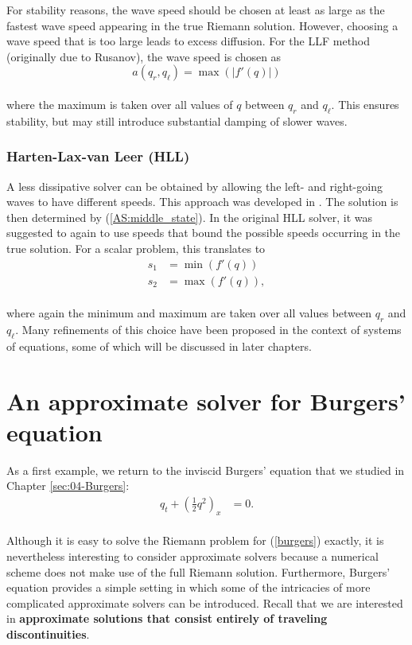 \documentclass{SIAMbook2016}
\begin{document}
For stability reasons, the wave speed should be chosen at least as large
as the fastest wave speed appearing in the true Riemann solution.
However, choosing a wave speed that is too large leads to excess
diffusion. For the LLF method (originally due to Rusanov), the wave
speed is chosen as \[a(q_r, q_\ell) = \max(|f'(q)|)\]\\
where the maximum is taken over all values of \(q\) between \(q_r\) and
\(q_\ell\). This ensures stability, but may still introduce substantial
damping of slower waves.

\hypertarget{harten-lax-van-leer-hll}{%
\subsection{Harten-Lax-van Leer (HLL)}\label{harten-lax-van-leer-hll}}

A less dissipative solver can be obtained by allowing the left- and
right-going waves to have different speeds. This approach was developed
in \cite{HLL}. The solution is then determined by
(\ref{AS:middle_state}). In the original HLL solver, it was suggested to
again to use speeds that bound the possible speeds occurring in the true
solution. For a scalar problem, this translates to\\
\begin{align*}
s_1 & = \min(f'(q)) \\
s_2 & = \max(f'(q)),
\end{align*}\\
where again the minimum and maximum are taken over all values between
\(q_r\) and \(q_\ell\). Many refinements of this choice have been
proposed in the context of systems of equations, some of which will be
discussed in later chapters.

\hypertarget{an-approximate-solver-for-burgers-equation}{%
\chapter{An approximate solver for Burgers'
equation}\label{an-approximate-solver-for-burgers-equation}}
\label{sec:11-Burgers_approximate}
As a first example, we return to the inviscid Burgers' equation that we
studied in Chapter \ref{sec:04-Burgers}:\\
\begin{align} \label{burgers}
q_t + \left(\frac{1}{2}q^2\right)_x & = 0.
\end{align}\\
Although it is easy to solve the Riemann problem for (\ref{burgers})
exactly, it is nevertheless interesting to consider approximate solvers
because a numerical scheme does not make use of the full Riemann
solution. Furthermore, Burgers' equation provides a simple setting in
which some of the intricacies of more complicated approximate solvers
can be introduced. Recall that we are interested in \textbf{approximate
solutions that consist entirely of traveling discontinuities}.
\end{document}
